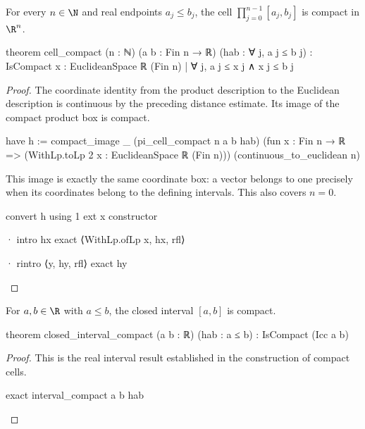 \begin{theorem}
  \label{ma:thm:k-cell-is-compact}
  For every $n\in\N$ and real endpoints $a_j\leq b_j$, the cell $\prod_{j=0}^{n-1}[a_j,b_j]$ is
  compact in $\R^{n}$.

  \begin{lean}
    theorem cell_compact (n : ℕ) (a b : Fin n → ℝ) (hab : ∀ j, a j ≤ b j) :
        IsCompact {x : EuclideanSpace ℝ (Fin n) | ∀ j, a j ≤ x j ∧ x j ≤ b j}
  \end{lean}
\end{theorem}

\begin{proof}
  The coordinate identity from the product description to the Euclidean description is continuous
  by the preceding distance estimate.
  Its image of the compact product box is compact.

  \begin{lean}
    have h := compact_image _ (pi_cell_compact n a b hab)
      (fun x : Fin n → ℝ => (WithLp.toLp 2 x : EuclideanSpace ℝ (Fin n)))
      (continuous_to_euclidean n)
  \end{lean}

  This image is exactly the same coordinate box: a vector belongs to one precisely when its
  coordinates belong to the defining intervals.
  This also covers $n=0$.

  \begin{lean}
    convert h using 1
    ext x
    constructor

    · intro hx
      exact ⟨WithLp.ofLp x, hx, rfl⟩

    · rintro ⟨y, hy, rfl⟩
      exact hy
  \end{lean}
\end{proof}

\begin{corollary}
  \label{ma:cor:closed-interval-in-R-is-compact}
  For $a,b\in\R$ with $a\leq b$, the closed interval $[a,b]$ is compact.

  \begin{lean}
    theorem closed_interval_compact (a b : ℝ) (hab : a ≤ b) : IsCompact (Icc a b)
  \end{lean}
\end{corollary}

\begin{proof}
  This is the real interval result established in the construction of compact cells.

  \begin{lean}
    exact interval_compact a b hab
  \end{lean}

\end{proof}

